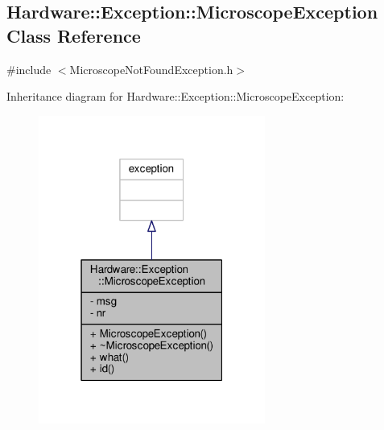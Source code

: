 \hypertarget{class_hardware_1_1_exception_1_1_microscope_exception}{}\subsection{Hardware\+:\+:Exception\+:\+:Microscope\+Exception Class Reference}
\label{class_hardware_1_1_exception_1_1_microscope_exception}


{\ttfamily \#include $<$Microscope\+Not\+Found\+Exception.\+h$>$}



Inheritance diagram for Hardware\+:\+:Exception\+:\+:Microscope\+Exception\+:
\nopagebreak
\begin{figure}[H]
\begin{center}
\leavevmode
\includegraphics[width=211pt]{class_hardware_1_1_exception_1_1_microscope_exception__inherit__graph}
\end{center}
\end{figure}


